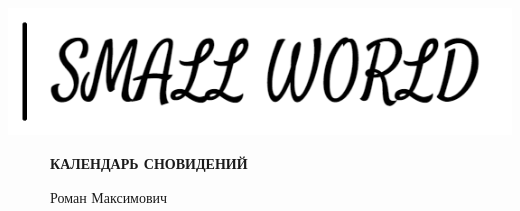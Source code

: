 \documentclass[openany, oneside]{book}
\begin{document}
\thispagestyle{empty}

\emptysymbol

\vspace{70mm}

\includegraphics{pictures/small_world.png}

\vspace{10mm}

\ \ \ \ \ \ {\LARGE \bfseries КАЛЕНДАРЬ СНОВИДЕНИЙ}

\vspace{7mm}

\ \ \ \ \ \ {\LARGE Роман Максимович}

\large

\newpage

\emptysymbol

\vspace{2cm}
\end{document}
